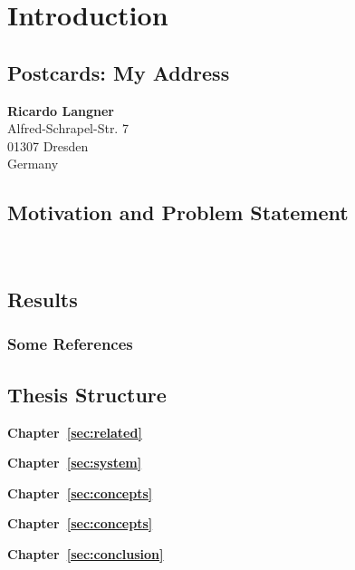 %
\chapter{Introduction}
\label{sec:intro}


\Blindtext[2][2]

\section{Postcards: My Address}
\label{sec:intro:address}

\textbf{Ricardo Langner} \\
Alfred-Schrapel-Str. 7 \\
01307 Dresden \\
Germany


\section{Motivation and Problem Statement}
\label{sec:intro:motivation}

\Blindtext[3][1]~\cite{Jurgens:2000,Jurgens:1995,Miede:2011,Kohm:2011,Apple:keynote:2010,Apple:numbers:2010,Apple:pages:2010}

\section{Results}
\label{sec:intro:results}

\Blindtext[1][2]

\subsection{Some References}
\label{sec:intro:results:refs}
\cite{WEB:GNU:GPL:2010,WEB:Miede:2011}

\section{Thesis Structure}
\label{sec:intro:structure}

\textbf{Chapter~\ref{sec:related}} \\[0.2em]
\blindtext{}

\textbf{Chapter~\ref{sec:system}} \\[0.2em]
\blindtext{}

\textbf{Chapter~\ref{sec:concepts}} \\[0.2em]
\blindtext{}

\textbf{Chapter~\ref{sec:concepts}} \\[0.2em]
\blindtext{}

\textbf{Chapter~\ref{sec:conclusion}} \\[0.2em]
\blindtext{}
